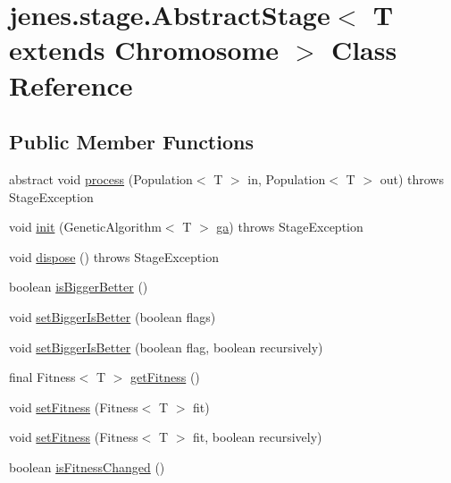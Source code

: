 \hypertarget{classjenes_1_1stage_1_1_abstract_stage_3_01_t_01extends_01_chromosome_01_4}{
\section{jenes.stage.AbstractStage$<$ T extends Chromosome $>$ Class Reference}
\label{classjenes_1_1stage_1_1_abstract_stage_3_01_t_01extends_01_chromosome_01_4}
}
\subsection*{Public Member Functions}
\begin{CompactItemize}
\item 
abstract void \hyperlink{classjenes_1_1stage_1_1_abstract_stage_3_01_t_01extends_01_chromosome_01_4_1e8398b28d820dc0e7343b15ce19c703}{process} (Population$<$ T $>$ in, Population$<$ T $>$ out)  throws StageException
\item 
void \hyperlink{classjenes_1_1stage_1_1_abstract_stage_3_01_t_01extends_01_chromosome_01_4_f16b278b3f7a6d9fd78e742621b956e5}{init} (GeneticAlgorithm$<$ T $>$ \hyperlink{classjenes_1_1stage_1_1_abstract_stage_3_01_t_01extends_01_chromosome_01_4_751aba4f46b29d22592d48422ffa75f9}{ga})  throws StageException 
\item 
void \hyperlink{classjenes_1_1stage_1_1_abstract_stage_3_01_t_01extends_01_chromosome_01_4_68d4104c004b50abf7b12ffc94122ddc}{dispose} ()  throws StageException 
\item 
boolean \hyperlink{classjenes_1_1stage_1_1_abstract_stage_3_01_t_01extends_01_chromosome_01_4_c20363682ebc9214d9253ff157a06a2d}{isBiggerBetter} ()
\item 
void \hyperlink{classjenes_1_1stage_1_1_abstract_stage_3_01_t_01extends_01_chromosome_01_4_dfddd6664c7f9f2eeba94d59de6fcebf}{setBiggerIsBetter} (boolean flags)
\item 
void \hyperlink{classjenes_1_1stage_1_1_abstract_stage_3_01_t_01extends_01_chromosome_01_4_003250025de6f005e247a05b107e5e8f}{setBiggerIsBetter} (boolean flag, boolean recursively)
\item 
final Fitness$<$ T $>$ \hyperlink{classjenes_1_1stage_1_1_abstract_stage_3_01_t_01extends_01_chromosome_01_4_9de5f0a09b7791fe1e93123ada1c434a}{getFitness} ()
\item 
void \hyperlink{classjenes_1_1stage_1_1_abstract_stage_3_01_t_01extends_01_chromosome_01_4_d60267d0a803c2991ac3ef02ababef2b}{setFitness} (Fitness$<$ T $>$ fit)
\item 
void \hyperlink{classjenes_1_1stage_1_1_abstract_stage_3_01_t_01extends_01_chromosome_01_4_ff1c8307dc89c4fcf7f253b50a87464d}{setFitness} (Fitness$<$ T $>$ fit, boolean recursively)
\item 
boolean \hyperlink{classjenes_1_1stage_1_1_abstract_stage_3_01_t_01extends_01_chromosome_01_4_811a041cd505ad8400b3c8b2aa36f4a9}{isFitnessChanged} ()
\end{CompactItemize}
